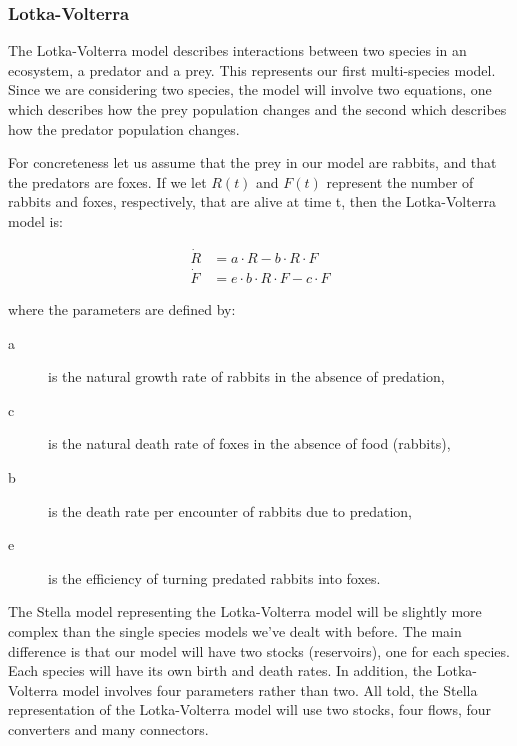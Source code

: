\subsubsection{Lotka-Volterra}

The Lotka-Volterra model describes interactions between two species in an ecosystem, a predator and a prey. This represents our first multi-species model. Since we are considering two species, the model will involve two equations, one which describes how the prey population changes and the second which describes how the predator population changes.

For concreteness let us assume that the prey in our model are rabbits, and that the predators are foxes. If we let $R(t)$ and $F(t)$ represent the number of rabbits and foxes, respectively, that are alive at time t, then the Lotka-Volterra model is:

\begin{align}
\dot R &= a\cdot R - b\cdot R\cdot F\\
\dot F &= e\cdot b\cdot R\cdot F - c\cdot F
\end{align}

where the parameters are defined by:
\begin{description}
\item[a] is the natural growth rate of rabbits in the absence of predation,
\item[c] is the natural death rate of foxes in the absence of food (rabbits),
\item[b] is the death rate per encounter of rabbits due to predation,
\item[e] is the efficiency of turning predated rabbits into foxes. 
\end{description}

The Stella model representing the Lotka-Volterra model will be slightly more complex than the single species models we've dealt with before. The main difference is that our model will have two stocks (reservoirs), one for each species. Each species will have its own birth and death rates. In addition, the Lotka-Volterra model involves four parameters rather than two. All told, the Stella representation of the Lotka-Volterra model will use two stocks, four flows, four converters and many connectors.


